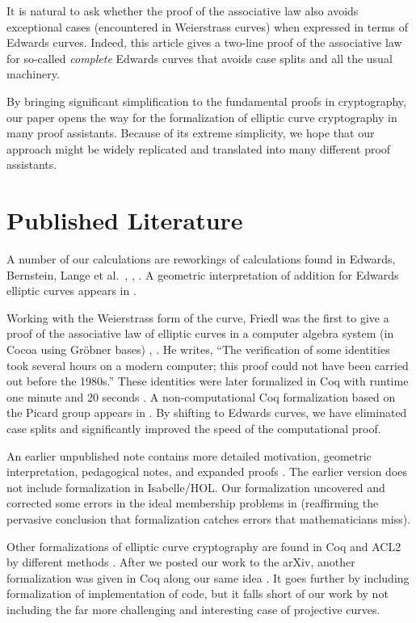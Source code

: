 \documentclass{llncs}
\begin{document}
It is natural to ask whether the proof of the associative law also
avoids exceptional cases (encountered in Weierstrass curves)
when expressed in terms of Edwards curves.
Indeed, this article gives a two-line proof of the associative law for
so-called \emph{complete} Edwards curves that avoids case splits and all
the usual machinery.

By bringing significant simplification to the fundamental proofs in
cryptography, our paper opens the way for the formalization of
elliptic curve cryptography in many proof assistants.  Because of its
extreme simplicity, we hope that our approach might be widely replicated
and translated into many different proof assistants.

\section{Published Literature}

A number of our calculations are reworkings of calculations found in
Edwards, Bernstein, Lange et al.~\cite{edwards2007normal},
\cite{bernstein2008twisted}, \cite{bernstein2007faster}.  A geometric
interpretation of addition for Edwards elliptic curves appears in
\cite{arene2011faster}.

Working with the Weierstrass form of the curve, Friedl was the first
to give a proof of the associative law of elliptic curves in a
computer algebra system (in Cocoa using Gr\"obner bases)
\cite{friedl}, \cite{friedl2017elementary}.  He writes, ``The
verification of some identities took several hours on a modern
computer; this proof could not have been carried out before the
1980s.''  These identities were later formalized in Coq with runtime one
minute and 20 seconds \cite{thery2007proving}.  A non-computational
Coq formalization based on the Picard group appears in
\cite{bartzia2014formal}.  By shifting to Edwards curves, we have
eliminated case splits and significantly improved the speed of the
computational proof.

An earlier unpublished note contains more detailed motivation,
geometric interpretation, pedagogical notes, and expanded proofs
\cite{hales2016group}.  The earlier version does not include
formalization in Isabelle/HOL.  Our formalization uncovered and
corrected some errors in the ideal membership problems in
\cite{hales2016group} (reaffirming the pervasive conclusion that
formalization catches errors that mathematicians miss).

Other formalizations of elliptic curve cryptography are found in Coq
and ACL2 by different methods \cite{russinoff2017computationally}.
After we posted our work to the arXiv, another formalization was given
in Coq along our same idea \cite{erbsen2017crafting}
\cite{erbsen2017systematic}.  It goes further by including
formalization of implementation of code, but it falls 
short of our work by not including the far more challenging and
interesting case of projective curves.
\end{document}

